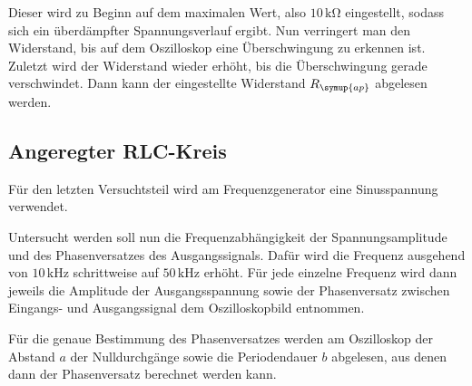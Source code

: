 Dieser wird zu Beginn auf dem maximalen Wert, also $10\,\unit{\kilo\ohm}$ eingestellt, sodass sich ein überdämpfter Spannungsverlauf ergibt.
Nun verringert man den Widerstand, bis auf dem Oszilloskop eine Überschwingung zu erkennen ist.
Zuletzt wird der Widerstand wieder erhöht, bis die Überschwingung gerade verschwindet.
Dann kann der eingestellte Widerstand $R_{\symup{ap}}$ abgelesen werden.

\subsection{Angeregter RLC-Kreis}
\label{sec:Angeregter RLC-Kreis}

Für den letzten Versuchtsteil wird am Frequenzgenerator eine Sinusspannung verwendet.

Untersucht werden soll nun die Frequenzabhängigkeit der Spannungsamplitude und des Phasenversatzes des Ausgangssignals.
Dafür wird die Frequenz ausgehend von $10\,\unit{\kilo\hertz}$ schrittweise auf $50\,\unit{\kilo\hertz}$ erhöht.
Für jede einzelne Frequenz wird dann jeweils die Amplitude der Ausgangsspannung sowie der Phasenversatz zwischen Eingangs-
und Ausgangssignal dem Oszilloskopbild entnommen.

Für die genaue Bestimmung des Phasenversatzes werden am Oszilloskop der Abstand $a$ der Nulldurchgänge sowie die Periodendauer $b$
abgelesen, aus denen dann der Phasenversatz berechnet werden kann.